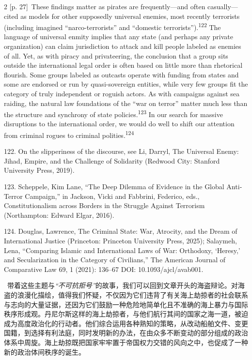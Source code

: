 \documentclass[10pt,a4paper]{article}
\begin{document}
\begin{paracol}{2}
\switchcolumn
{\scriptsize\color{gray} [p. 27]}\ These findings matter as pirates are frequently—and often casually—cited as models for other supposedly universal enemies, most recently terrorists (including imagined “narco-terrorists” and “domestic terrorists”).\nobreak\textsuperscript{122} The language of universal enmity implies that any state (and perhaps any private organization) can claim jurisdiction to attack and kill people labeled as enemies of all. Yet, as with piracy and privateering, the conclusion that a group sits outside the international legal order is often based on little more than rhetorical flourish. Some groups labeled as outcasts operate with funding from states and some are endorsed or run by quasi-sovereign entities, while very few groups fit the category of truly independent or roguish actors. As with campaigns against sea raiding, the natural law foundations of the “war on terror” matter much less than the structure and synchrony of state policies.\nobreak\textsuperscript{123} In our search for massive disruptions to the international order, we would do well to shift our attention from criminal rogues to criminal polities.\nobreak\textsuperscript{124}\par{\small 122. On the slipperiness of the discourse, see Li, Darryl, The Universal Enemy: Jihad, Empire, and the Challenge of Solidarity (Redwood City: Stanford University Press, 2019).\par}{\small 123. Scheppele, Kim Lane, “The Deep Dilemma of Evidence in the Global Anti‐Terror Campaign,” in Jackson, Vicki and Fabbrini, Federico, eds., Constitutionalism across Borders in the Struggle Against Terrorism (Northampton: Edward Elgar, 2016).\par}{\small 124. Douglas, Lawrence, The Criminal State: War, Atrocity, and the Dream of International Justice (Princeton: Princeton University Press, 2025); Salaymeh, Lena, “Comparing Islamic and International Laws of War: Orthodoxy, ‘Heresy,’ and Secularization in the Category of Civilians,” The American Journal of Comparative Law 69, 1 (2021): 136–67 DOI: 10.1093/ajcl/avab001.\par}
\switchcolumn*
{\scriptsize\color{gray} [p. 28]}\ 带着这些主题与\textit{“不可抗拒号”}的故事，我们可以回到文章开头的海盗辩论。对海盗的浪漫化描绘，值得我们怀疑，不仅因为它们违背了有关海上劫掠者的社会联系与志向的大量证据，还因为它们鼓励一种危险地简单化且不准确的海上暴力与国际秩序形成观。丹尼尔斯这样的海上劫掠者，与他们航行其间的国家之海一道，被迫成为高度政治化的行动者。他们综合运用各种熟知的策略，从改动船舶文件、变更国籍，到选择有利法庭，同时发明新的办法，在由众多不断变动的部分组成的政治体系中周旋。海上劫掠既把国家牢牢置于帝国权力交错的风向之中，也促成了一种新的政治体间秩序的诞生。\par

\end{paracol}
\end{document}
